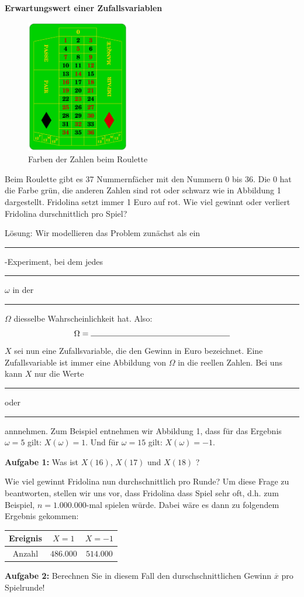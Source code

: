 \documentclass{article}
\begin{document}
\setcounter{section}{1}\setcounter{subsection}{0}

\textbf{Erwartungswert einer Zufallsvariablen}

\begin{figure}
  \includegraphics[width=4.5cm]{Roulette_frz.png}
  \caption{Farben der Zahlen beim Roulette}
\end{figure}
Beim Roulette gibt es 37 Nummernf\"acher mit den Nummern 0 bis 36. Die 0 hat die Farbe gr\"un, die anderen Zahlen sind rot oder schwarz wie in Abbildung 1 dargestellt. Fridolina setzt immer 1 Euro auf rot. Wie viel gewinnt oder verliert Fridolina durschnittlich pro Spiel? 

Lösung: Wir modellieren das Problem zun\"achst als ein \rule{2cm}{.4pt}-Experiment, bei dem jedes \rule{3cm}{.4pt} $\omega$ in der \rule{3cm}{.4pt} $\Omega$ diesselbe Wahrscheinlichkeit hat.
Also: $$\Omega = \rule{6cm}{.4pt} $$
$X$ sei nun eine Zufallsvariable, die den Gewinn in Euro bezeichnet. Eine Zufallsvariable ist immer eine Abbildung von $\Omega$ in die reellen Zahlen. Bei uns kann $X$ nur die Werte \rule{1cm}{.4pt} oder \rule{1cm}{.4pt} annnehmen. Zum Beispiel entnehmen wir Abbildung 1, dass für das Ergebnis $\omega = 5$ gilt: $X\left( \omega \right) = 1$. Und für $\omega = 15$ gilt: $X\left( \omega \right) = -1$.

\textbf{Aufgabe 1:} Was ist $X\left( 16 \right)$, $X\left( 17 \right)$ und $X\left( 18 \right)$ ?
\vspace{1cm}

Wie viel gewinnt Fridolina nun durchschnittlich pro Runde? Um diese Frage zu beantworten, stellen wir uns vor, dass Fridolina dass Spiel sehr oft, d.h. zum Beispiel, $n=1.000.000$-mal spielen würde. Dabei wäre es dann zu folgendem Ergebnis gekommen:
\begin{center}
\renewcommand{\arraystretch}{1.7}
 \begin{tabular}{|c|c|c|}
 \hline
 Ereignis & $X=1$ & $X=-1$ \\
 \hline
 Anzahl & $486.000$ & $514.000$ \\
 \hline
 \end{tabular}
 \end{center}
 \textbf{Aufgabe 2:} Berechnen Sie in diesem Fall den durschschnittlichen Gewinn $\overline{x}$ pro Spielrunde!
\vspace{2cm}
\end{document}
